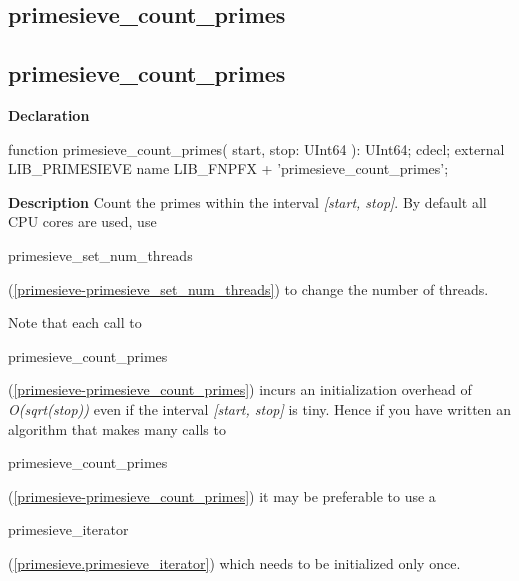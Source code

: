 \documentclass{report}
\newif\ifpdf
\begin{document}
\subsection*{\large{\textbf{primesieve{\_}count{\_}primes}}\normalsize\hspace{1ex}\hrulefill}
\else
\subsection*{primesieve{\_}count{\_}primes}
\fi
\label{primesieve-primesieve_count_primes}
\begin{list}{}{
\setlength{\itemindent}{0cm}
\setlength{\listparindent}{0cm}
\setlength{\leftmargin}{\evensidemargin}
\addtolength{\leftmargin}{\tmplength}
\settowidth{\labelsep}{X}
\addtolength{\leftmargin}{\labelsep}
\setlength{\labelwidth}{\tmplength}
}
\item[\textbf{Declaration}\hfill]
\ifpdf
\begin{flushleft}
\fi
\begin{ttfamily}
function primesieve{\_}count{\_}primes( start, stop: UInt64 ): UInt64; cdecl; external LIB{\_}PRIMESIEVE name LIB{\_}FNPFX + 'primesieve{\_}count{\_}primes';\end{ttfamily}

\ifpdf
\end{flushleft}
\fi

\par
\item[\textbf{Description}]
Count the primes within the interval \textit{[start, stop]}. By default all CPU cores are used, use \begin{ttfamily}primesieve{\_}set{\_}num{\_}threads\end{ttfamily}(\ref{primesieve-primesieve_set_num_threads}) to change the number of threads.

Note that each call to \begin{ttfamily}primesieve{\_}count{\_}primes\end{ttfamily}(\ref{primesieve-primesieve_count_primes}) incurs an initialization overhead of \textit{O(sqrt(stop))} even if the interval \textit{[start, stop]} is tiny. Hence if you have written an algorithm that makes many calls to \begin{ttfamily}primesieve{\_}count{\_}primes\end{ttfamily}(\ref{primesieve-primesieve_count_primes}) it may be preferable to use a \begin{ttfamily}primesieve{\_}iterator\end{ttfamily}(\ref{primesieve.primesieve_iterator}) which needs to be initialized only once.

\end{list}
\ifpdf
\end{document}
